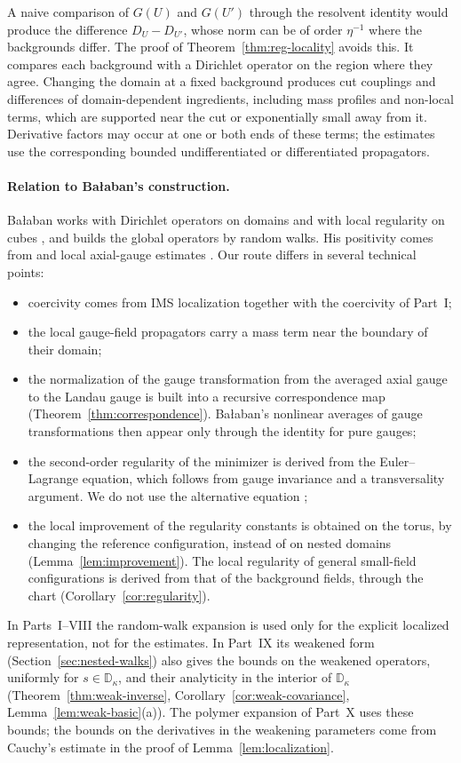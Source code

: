 A naive comparison of $G(U)$ and $G(U')$ through the resolvent identity would produce the difference $D_U-D_{U'}$, whose norm can be of order $\eta^{-1}$ where the backgrounds differ. The proof of Theorem~\ref{thm:reg-locality} avoids this. It compares each background with a Dirichlet operator on the region where they agree. Changing the domain at a fixed background produces cut couplings and differences of domain-dependent ingredients, including mass profiles and non-local terms, which are supported near the cut or exponentially small away from it. Derivative factors may occur at one or both ends of these terms; the estimates use the corresponding bounded undifferentiated or differentiated propagators.

\paragraph{Relation to Ba\l aban's construction.} Ba\l aban works with Dirichlet operators on domains \cite{BalBackground} and with local regularity on cubes \cite[(3.35)--(3.36)]{BalBackground}, and builds the global operators by random walks. His positivity comes from \cite[Theorem~3.11]{BalBackground} and local axial-gauge estimates \cite[Lemma~2.4]{BalPropII}. Our route differs in several technical points:
\begin{itemize}
\item coercivity comes from IMS localization together with the coercivity of Part~I;
\item the local gauge-field propagators carry a mass term near the boundary of their domain;
\item the normalization of the gauge transformation from the averaged axial gauge to the Landau gauge is built into a recursive correspondence map (Theorem~\ref{thm:correspondence}). Ba\l aban's nonlinear averages of gauge transformations then appear only through the identity for pure gauges;
\item the second-order regularity of the minimizer is derived from the Euler--Lagrange equation, which follows from gauge invariance and a transversality argument. We do not use the alternative equation \cite[(143)]{BalVar};
\item the local improvement of the regularity constants is obtained on the torus, by changing the reference configuration, instead of on nested domains (Lemma~\ref{lem:improvement}). The local regularity of general small-field configurations is derived from that of the background fields, through the chart (Corollary~\ref{cor:regularity}).
\end{itemize}
In Parts~I--VIII the random-walk expansion is used only for the explicit localized representation, not for the estimates. In Part~IX its weakened form (Section~\ref{sec:nested-walks}) also gives the bounds on the weakened operators, uniformly for $s\in\mathbb D_\kappa$, and their analyticity in the interior of $\mathbb D_\kappa$ (Theorem~\ref{thm:weak-inverse}, Corollary~\ref{cor:weak-covariance}, Lemma~\ref{lem:weak-basic}(a)). The polymer expansion of Part~X uses these bounds; the bounds on the derivatives in the weakening parameters come from Cauchy's estimate in the proof of Lemma~\ref{lem:localization}.

